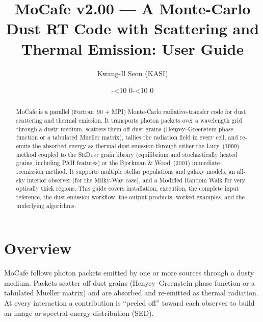 \documentclass[english,a4paper]{kiseon_memo}
\begin{document}
\title{MoCafe v2.00 --- A Monte-Carlo Dust RT Code
       with Scattering and Thermal Emission: User Guide}
\author{Kwang-Il Seon (KASI)}
\date{\the\year-\ifnum\month<10 0\fi\the\month-\ifnum\day<10 0\fi\the\day}
\maketitle

\begin{abstract}
\noindent
MoCafe is a parallel (Fortran~90 + MPI) Monte-Carlo radiative-transfer code for
dust scattering and thermal emission.  It transports photon packets over a
wavelength grid through a dusty medium, scatters them off dust grains
(Henyey--Greenstein phase function or a tabulated Mueller matrix), tallies the
radiation field in every cell, and re-emits the absorbed energy as thermal dust
emission through either the Lucy~(1999) method coupled to the \textsc{SEDust}
grain library (equilibrium and stochastically heated grains, including PAH
features) or the Bjorkman \& Wood~(2001) immediate-reemission method.  It
supports multiple stellar populations and galaxy models, an all-sky interior
observer (for the Milky-Way case), and a Modified Random Walk for very optically
thick regions.  This guide covers installation, execution, the complete input
reference, the dust-emission workflow, the output products, worked examples, and
the underlying algorithms.
\end{abstract}

\tableofcontents
\clearpage

\section{Overview}

MoCafe follows photon packets emitted by one or more sources through a dusty
medium.  Packets scatter off dust grains (Henyey--Greenstein phase function or
a tabulated Mueller matrix) and are absorbed and re-emitted as thermal
radiation.  At every interaction a contribution is ``peeled off'' toward each
observer to build an image or spectral-energy distribution (SED).
\end{document}
